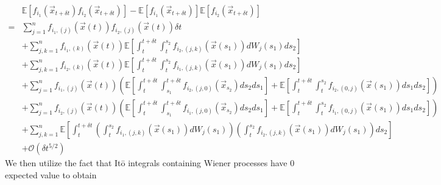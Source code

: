 \documentclass[12pt]{article}
\begin{document}
\begin{equation}
\begin{aligned}
&\mathbb{E} \left[ f_{i_1}(\vec{x}_{t + \delta t}) f_{i_2}(\vec{x}_{t + \delta t}) \right] 
- \mathbb{E} \left[ f_{i_1}(\vec{x}_{t + \delta t}) \right] \mathbb{E} \left[ f_{i_2}(\vec{x}_{t + \delta t}) \right] \\
=& 
 \sum_{j=1}^n f_{{i_1},(j)}(\vec{x}(t)) f_{{i_2},(j)}(\vec{x}(t)) \delta t \\
&+ \sum_{j,k=1}^n f_{{i_1},(k)}(\vec{x}(t)) \mathbb{E} \left[  \int_t^{t+\delta t} \int_t^{s_2} f_{{i_2},(j,k)}(\vec{x}(s_1)) dW_j(s_1) ds_2 \right] \\
&+  \sum_{j, k=1}^n  f_{{i_2},(k)}(\vec{x}(t))\mathbb{E} \left[ \int_t^{t+\delta t} \int_t^{s_2} f_{{i_1},(j,k)}(\vec{x}(s_1)) dW_j(s_1) ds_2 \right]\\
&+ \sum_{j=1}^n f_{{i_1},(j)}(\vec{x}(t)) \left( \mathbb{E} \left[ \int_t^{t+\delta t} \int_{s_1}^{t+\delta t} f_{{i_2},(j,0)}(\vec{x}_{s_2}) ds_2 ds_1 \right] 
+ \mathbb{E} \left[  \int_t^{t+\delta t} \int_t^{s_2} f_{{i_2},(0,j)}(\vec{x}(s_1)) ds_1 ds_2\right] \right) \\
&+  \sum_{j=1}^n f_{{i_2},(j)}(\vec{x}(t)) \left( \mathbb{E} \left[ \int_t^{t+\delta t} \int_{s_1}^{t + \delta t} f_{{i_1},(j,0)}(\vec{x}_{s_2}) ds_2 ds_1 \right]
+ \mathbb{E} \left[ \int_t^{t+\delta t} \int_t^{s_2} f_{{i_1},(0,j)}(\vec{x}(s_1)) ds_1 ds_2 \right] \right) \\
&+ \sum_{j, k=1}^n \mathbb{E} \left[ \int_t^{t+\delta t}\left( \int_t^{s_2} f_{{i_1},(j,k)}(\vec{x}(s_1)) dW_j(s_1)  \right) \left(  \int_t^{s_2} f_{{i_2},(j,k)}(\vec{x}(s_1)) dW_j(s_1) \right) ds_2 \right] \\
&+ \mathcal{O} (\delta t^{5/2})
\end{aligned}
\end{equation}
%
We then utilize the fact that It\={o} integrals containing Wiener processes have 0 expected value to obtain
\end{document}
